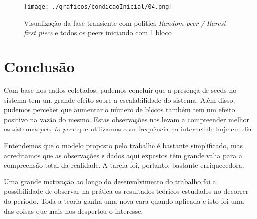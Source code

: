 \documentclass[a4paper,10pt]{article}
\begin{document}
\begin{figure}
	\caption{Visualização da fase transiente com política \textit{Random peer / Rarest first piece} e todos os peers iniciando com 1 bloco}
	\label{figCI1rf}
	\texttt{[image: ./graficos/condicaoInicial/04.png]}
\end{figure}

\clearpage
\pagebreak

\section{Conclusão}

Com base nos dados coletados, pudemos concluir que a presença de seeds no sistema tem um grande efeito sobre a escalabilidade do sistema. Além disso, pudemos perceber que aumentar o número de blocos também tem um efeito positivo na vazão do mesmo. Estas observações nos levam a compreender melhor os sistemas \textit{peer-to-peer} que utilizamos com frequência na internet de hoje em dia.

Entendemos que o modelo proposto pelo trabalho é bastante simplificado, mas acreditamos que as observações e dados aqui expostos têm grande valia para a compreensão total da realidade. A tarefa foi, portanto, bastante enriquecedora.

Uma grande motivação ao longo do desenvolvimento do trabalho foi a possibilidade de observar na prática os resultados teóricos estudados no decorrer do período. Toda a teoria ganha uma nova cara quando aplicada e isto foi uma das coisas que mais nos despertou o interesse.

\pagebreak
\end{document}
